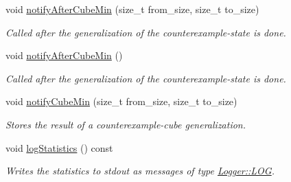 \begin{DoxyCompactItemize}
void \hyperlink{classLearnStatisticsQBF_a6fe040a580ab91a1ced5334028bb8cf7}{notify\-After\-Cube\-Min} (size\-\_\-t from\-\_\-size, size\-\_\-t to\-\_\-size)
\begin{DoxyCompactList}\small\item\em Called after the generalization of the counterexample-\/state is done. \end{DoxyCompactList}\item 
void \hyperlink{classLearnStatisticsQBF_ad6964e03b41d0e14834a06aa034c30e3}{notify\-After\-Cube\-Min} ()
\begin{DoxyCompactList}\small\item\em Called after the generalization of the counterexample-\/state is done. \end{DoxyCompactList}\item 
void \hyperlink{classLearnStatisticsQBF_a4c17af33270921d54e425cd6d14b1a78}{notify\-Cube\-Min} (size\-\_\-t from\-\_\-size, size\-\_\-t to\-\_\-size)
\begin{DoxyCompactList}\small\item\em Stores the result of a counterexample-\/cube generalization. \end{DoxyCompactList}\item 
void \hyperlink{classLearnStatisticsQBF_a6746f60721bd214d479a3e48e7246f3f}{log\-Statistics} () const 
\begin{DoxyCompactList}\small\item\em Writes the statistics to stdout as messages of type \hyperlink{classLogger_ac9e601f90bf326ce2088de52018861dca07be7495a7931bee16f5d94b3671f5de}{Logger\-::\-L\-O\-G}. \end{DoxyCompactList}\end{DoxyCompactItemize}
